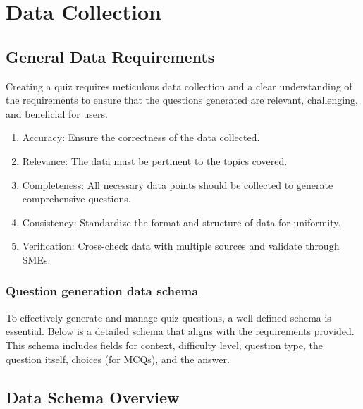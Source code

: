 \chapter{Data Collection}

\section{General Data Requirements}
Creating a quiz requires meticulous data collection and a clear understanding of the requirements to ensure that the questions generated are relevant, challenging, and beneficial for users.

\begin{enumerate}
        \begin{enumerate}[label*=\arabic*.]
            \item Accuracy: Ensure the correctness of the data collected.
            \item Relevance: The data must be pertinent to the topics covered.
            \item Completeness: All necessary data points should be collected to generate comprehensive questions.
            \item Consistency: Standardize the format and structure of data for uniformity.
            \item Verification: Cross-check data with multiple sources and validate through SMEs.
        \end{enumerate}
\end{enumerate}



\subsection{Question generation data schema}
To effectively generate and manage quiz questions, a well-defined schema is essential. Below is a detailed schema that aligns with the requirements provided. This schema includes fields for context, difficulty level, question type, the question itself, choices (for MCQs), and the answer.

\newpage
\section*{Data Schema Overview}

